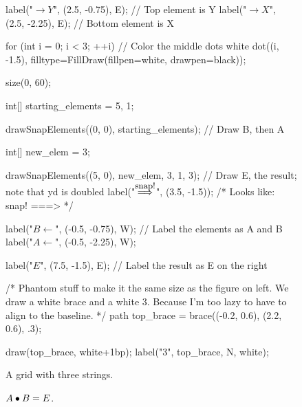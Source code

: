 \documentclass[../textbook.tex]{subfiles}
\begin{document}
\begin{figure}[h]
\begin{center}
\begin{minipage}[b]{0.45\textwidth}
\begin{asy}[width=0.3\textwidth]
				label("$\rightarrow Y$", (2.5, -0.75), E); // Top element is Y
				label("$\rightarrow X$", (2.5, -2.25), E); // Bottom element is X

				for (int i = 0; i < 3; ++i) // Color the middle dots white
					dot((i, -1.5), filltype=FillDraw(fillpen=white, drawpen=black));
			\end{asy}
		\end{minipage}
		\hfill
		\begin{minipage}[b]{0.45\textwidth}
			\centering
			\begin{asy}[width=0.7\textwidth]
				size(0, 60);

				int[] starting_elements = {5, 1};

				drawSnapElements((0, 0), starting_elements); // Draw B, then A

				int[] new_elem = {3};

				drawSnapElements((5, 0), new_elem, 3, 1, 3); // Draw E, the result; note that yd is doubled
				label("$\stackrel{\mbox{\small snap!}}{\Longrightarrow}$", (3.5, -1.5));
				/* Looks like:
				snap!
				===>  */

				label("$B \leftarrow$", (-0.5, -0.75), W); // Label the elements as A and B
				label("$A \leftarrow$", (-0.5, -2.25), W);

				label("$E$", (7.5, -1.5), E); // Label the result as E on the right

				/* Phantom stuff to make it the same size as the figure on left. We draw a white brace and a white 3. Because I'm too lazy to have to align to the baseline. */
				path top_brace = brace((-0.2, 0.6), (2.2, 0.6), .3);

				draw(top_brace, white+1bp);
				label("$3$", top_brace, N, white);
			\end{asy}
		\end{minipage}
	\end{center}
	\vspace*{-2\baselineskip}
	\begin{center}
		\begin{minipage}[t]{0.45\textwidth}
			\caption{A grid with three strings.}
			\label{fig:n_rows_3_cols_ex}
		\end{minipage}
		\hfill
		\begin{minipage}[t]{0.45\textwidth}
			\caption{$A\bullet B = E$.}
			\label{fig:snap_ex}
		\end{minipage}
	\end{center}
	\vspace*{-2\baselineskip}
\end{figure}
\end{document}
